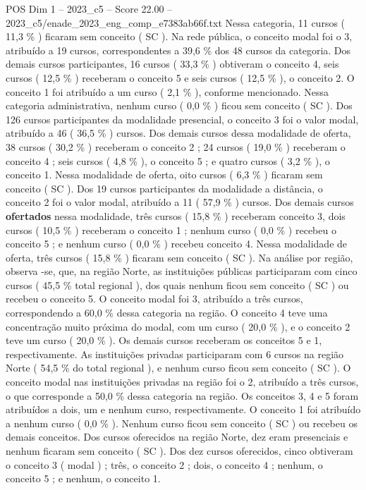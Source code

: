 \begin{textsample}{POS Dim 1 – 2023\_c5 – Score 22.00 – 2023\_c5/enade\_2023\_eng\_comp\_e7383ab66f.txt}
Nessa categoria, 11 cursos ( 11,3 \% ) ficaram sem conceito ( SC ).
Na rede pública, o conceito modal foi o 3, atribuído a 19 cursos, correspondentes a 39,6 \% dos 48 cursos da categoria.
Dos demais cursos participantes, 16 cursos ( 33,3 \% ) obtiveram o conceito 4, seis cursos ( 12,5 \% ) receberam o conceito 5 e seis cursos ( 12,5 \% ), o conceito 2.
O conceito 1 foi atribuído a um curso ( 2,1 \% ), conforme mencionado.
Nessa categoria administrativa, nenhum curso ( 0,0 \% ) ficou sem conceito ( SC ).
Dos 126 cursos participantes da modalidade presencial, o conceito 3 foi o valor modal, atribuído a 46 ( 36,5 \% ) cursos.
Dos demais cursos dessa modalidade de oferta, 38 cursos ( 30,2 \% ) receberam o conceito 2 ; 24 cursos ( 19,0 \% ) receberam o conceito 4 ; seis cursos ( 4,8 \% ), o conceito 5 ; e quatro cursos ( 3,2 \% ), o conceito 1.
Nessa modalidade de oferta, oito cursos ( 6,3 \% ) ficaram sem conceito ( SC ).
Dos 19 cursos participantes da modalidade a distância, o conceito 2 foi o valor modal, atribuído a 11 ( 57,9 \% ) cursos.
Dos demais cursos \textbf{ofertados} nessa modalidade, três cursos ( 15,8 \% ) receberam conceito 3, dois cursos ( 10,5 \% ) receberam o conceito 1 ; nenhum curso ( 0,0 \% ) recebeu o conceito 5 ; e nenhum curso ( 0,0 \% ) recebeu conceito 4.
Nessa modalidade de oferta, três cursos ( 15,8 \% ) ficaram sem conceito ( SC ).
Na análise por região, observa -se, que, na região Norte, as instituições públicas participaram com cinco cursos ( 45,5 \% total regional ), dos quais nenhum ficou sem conceito ( SC ) ou recebeu o conceito 5.
O conceito modal foi 3, atribuído a três cursos, correspondendo a 60,0 \% dessa categoria na região.
O conceito 4 teve uma concentração muito próxima do modal, com um curso ( 20,0 \% ), e o conceito 2 teve um curso ( 20,0 \% ).
Os demais cursos receberam os conceitos 5 e 1, respectivamente.
As instituições privadas participaram com 6 cursos na região Norte ( 54,5 \% do total regional ), e nenhum curso ficou sem conceito ( SC ).
O conceito modal nas instituições privadas na região foi o 2, atribuído a três cursos, o que corresponde a 50,0 \% dessa categoria na região.
Os conceitos 3, 4 e 5 foram atribuídos a dois, um e nenhum curso, respectivamente.
O conceito 1 foi atribuído a nenhum curso ( 0,0 \% ).
Nenhum curso ficou sem conceito ( SC ) ou recebeu os demais conceitos.
Dos cursos oferecidos na região Norte, dez eram presenciais e nenhum ficaram sem conceito ( SC ).
Dos dez cursos oferecidos, cinco obtiveram o conceito 3 ( modal ) ; três, o conceito 2 ; dois, o conceito 4 ; nenhum, o conceito 5 ; e nenhum, o conceito 1.

\end{textsample}
